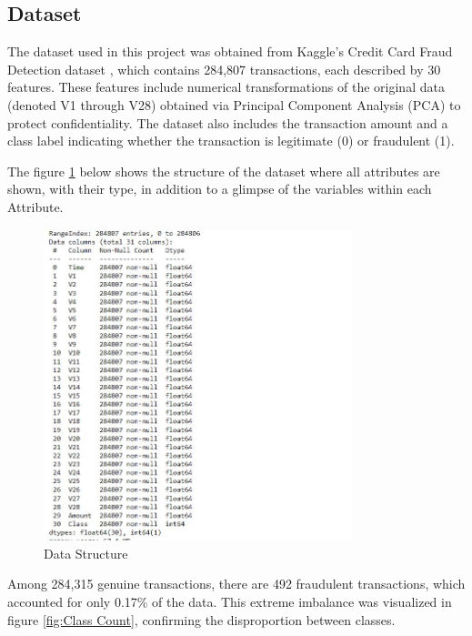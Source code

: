 \documentclass[11pt]{article}
\begin{document}
\subsection{Dataset}
The dataset used in this project was obtained from Kaggle's Credit Card Fraud Detection dataset \cite{cc_default}, which contains 284,807 transactions, each described by 30 features. These features include numerical transformations of the original data (denoted V1 through V28) obtained via Principal Component Analysis (PCA) to protect confidentiality. The dataset also includes the transaction amount and a class label indicating whether the transaction is legitimate (0) or fraudulent (1).

The figure \ref{fig:Data Structure} below shows the structure of the dataset where all attributes are shown, with their type, in addition to a glimpse of the variables within each
Attribute.

\begin{figure}[H]
	\centering
	\includegraphics[width=0.8\textwidth]{figure/Data_Structure.jpg}
	\caption{Data Structure}
	\label{fig:Data Structure}
\end{figure} 

Among 284,315 genuine transactions, there are 492  fraudulent transactions, which accounted for only 0.17\% of the data. This extreme imbalance was visualized in figure \ref{fig:Class Count}, confirming the disproportion between classes.
\end{document}

